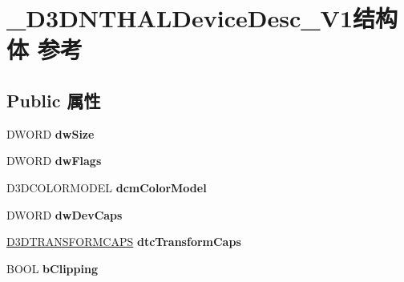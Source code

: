 \hypertarget{struct___d3_d_n_t_h_a_l_device_desc___v1}{}\section{\+\_\+\+D3\+D\+N\+T\+H\+A\+L\+Device\+Desc\+\_\+\+V1结构体 参考}
\label{struct___d3_d_n_t_h_a_l_device_desc___v1}
\subsection*{Public 属性}
\begin{DoxyCompactItemize}
\item 
\mbox{\label{struct___d3_d_n_t_h_a_l_device_desc___v1_a9a16534aa87e88f489ed25498c4bae3b}} 
D\+W\+O\+RD {\bfseries dw\+Size}
\item 
\mbox{\label{struct___d3_d_n_t_h_a_l_device_desc___v1_a50feac4f38182a0f0495c65412233331}} 
D\+W\+O\+RD {\bfseries dw\+Flags}
\item 
\mbox{\label{struct___d3_d_n_t_h_a_l_device_desc___v1_ab136316b95667954e1f1d122d6f51964}} 
D3\+D\+C\+O\+L\+O\+R\+M\+O\+D\+EL {\bfseries dcm\+Color\+Model}
\item 
\mbox{\label{struct___d3_d_n_t_h_a_l_device_desc___v1_aaaa75ebe73ac14db06da8d89f7478bb0}} 
D\+W\+O\+RD {\bfseries dw\+Dev\+Caps}
\item 
\mbox{\label{struct___d3_d_n_t_h_a_l_device_desc___v1_af035c6e77c51041afb030eb8914a467e}} 
\hyperlink{struct___d3_d_t_r_a_n_s_f_o_r_m_c_a_p_s}{D3\+D\+T\+R\+A\+N\+S\+F\+O\+R\+M\+C\+A\+PS} {\bfseries dtc\+Transform\+Caps}
\item 
\mbox{\label{struct___d3_d_n_t_h_a_l_device_desc___v1_aece19b262caca855194067de810d5ab6}} 
B\+O\+OL {\bfseries b\+Clipping}
\item 
\mbox{\label{struct___d3_d_n_t_h_a_l_device_desc___v1_a17d5208a765ffd1392bed3d0569fb40a}} 

\end{DoxyCompactItemize}

